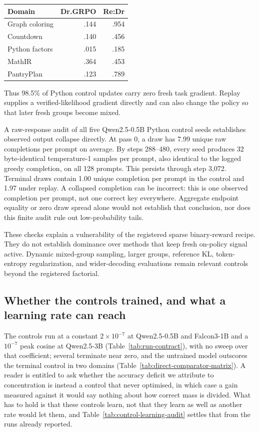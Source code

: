 \documentclass{article}
\newcommand{\1}{\mathbf 1}
\theoremstyle{remark}
\theoremstyle{definition}
\theoremstyle{plain}
\begin{document}
\begin{center}
\small
\begin{tabular}{@{}lrr@{}}
\toprule
\textbf{Domain} & \textbf{Dr.GRPO} & \textbf{Re:Dr} \\
\midrule
Graph coloring & .144 & .954 \\
Countdown & .140 & .456 \\
Python factors & .015 & .185 \\
MathIR & .364 & .453 \\
PantryPlan & .123 & .789 \\
\bottomrule
\end{tabular}
\end{center}

Thus 98.5\% of Python control updates carry zero fresh task gradient.
Replay supplies a verified-likelihood gradient directly and can also
change the policy so that later fresh groups become mixed.

A raw-response audit of all five Qwen2.5-0.5B Python control seeds establishes
observed output collapse directly. At pass 0, a draw has 7.99 unique raw
completions per prompt on average. By steps 288--480, every seed produces
32 byte-identical temperature-1 samples per prompt, also identical to the
logged greedy completion, on all 128 prompts. This persists through step
3,072. Terminal draws contain 1.00 unique completion per prompt in the
control and 1.97 under replay. A collapsed completion can be incorrect:
this is one observed completion per prompt, not one correct key everywhere.
Aggregate endpoint equality or zero draw spread alone would not establish
that conclusion, nor does this finite audit rule out low-probability tails.

These checks explain a vulnerability of the registered sparse binary-reward
recipe. They do not establish dominance over methods that keep fresh
on-policy signal active. Dynamic mixed-group sampling, larger groups,
reference KL, token-entropy regularization, and wider-decoding evaluations
remain relevant controls beyond the registered factorial.

\subsection{Whether the controls trained, and what a learning rate can reach}
\label{app:control-learning-audit}

The controls run at a constant $2\times10^{-7}$ at Qwen2.5-0.5B and Falcon3-1B
and a $10^{-7}$ peak cosine at Qwen2.5-3B (Table~\ref{tab:run-contract}), with
no sweep over that coefficient; several terminate near zero, and the untrained
model outscores the terminal control in two domains
(Table~\ref{tab:direct-comparator-matrix}). A reader is entitled to ask whether
the accuracy deficit we attribute to concentration is instead a control that
never optimised, in which case a gain measured against it would say nothing
about how correct mass is divided. What has to hold is that these controls
learn, not that they learn as well as another rate would let them, and
Table~\ref{tab:control-learning-audit} settles that from the runs already
reported.
\end{document}
